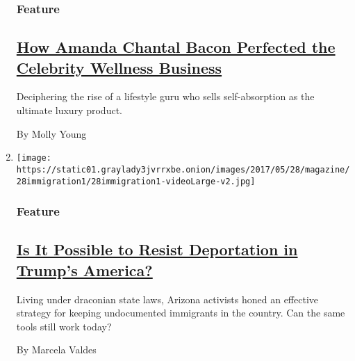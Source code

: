 \begin{enumerate}
  \hypertarget{feature-2}{%
  \subsubsection{Feature}\label{feature-2}}

  \hypertarget{how-amanda-chantal-bacon-perfected-the-celebrity-wellness-business}{%
  \subsection{\texorpdfstring{\href{/2017/05/25/magazine/how-amanda-chantal-bacon-perfected-the-celebrity-wellness-business.html}{How
  Amanda Chantal Bacon Perfected the Celebrity Wellness
  Business}}{How Amanda Chantal Bacon Perfected the Celebrity Wellness Business}}\label{how-amanda-chantal-bacon-perfected-the-celebrity-wellness-business}}

  Deciphering the rise of a lifestyle guru who sells self-absorption as
  the ultimate luxury product.

  By Molly Young
\item
  \texttt{[image: https://static01.graylady3jvrrxbe.onion/images/2017/05/28/magazine/28immigration1/28immigration1-videoLarge-v2.jpg]}

  \hypertarget{feature-3}{%
  \subsubsection{Feature}\label{feature-3}}

  \hypertarget{is-it-possible-to-resist-deportation-in-trumps-america}{%
  \subsection{\texorpdfstring{\href{/2017/05/23/magazine/is-it-possible-to-resist-deportation-in-trumps-america.html}{Is
  It Possible to Resist Deportation in Trump's
  America?}}{Is It Possible to Resist Deportation in Trump's America?}}\label{is-it-possible-to-resist-deportation-in-trumps-america}}

  Living under draconian state laws, Arizona activists honed an
  effective strategy for keeping undocumented immigrants in the country.
  Can the same tools still work today?

  By Marcela Valdes
\end{enumerate}

